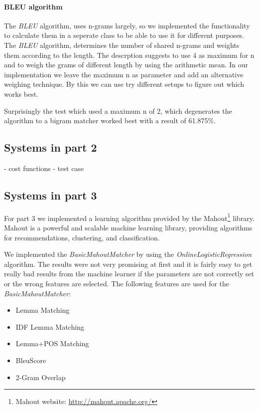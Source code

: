 \paragraph{BLEU algorithm}
The \textit{BLEU} algorithm, uses n-grams largely, so we implemented the functionality to
calculate them in a seperate class to be able to use it for different purposes.
The \textit{BLEU} algorithm, determines the number of shared n-grams and weights them
according to the length. The descrption suggests to use 4 as maximum for n and to weigh
the grams of different length by using the arithmetic mean. In our implementation we leave
the maximum n as parameter and add an alternative weighing technique. By this we can use
try different setups to figure out which works best. 

Surprisingly the test which used a maximum n of 2, which degenerates the algorithm to a
bigram matcher worked best with a result of 61.875\%.

\subsection{Systems in part 2}

- cost functions
- test case

\subsection{Systems in part 3}
For part 3 we implemented a learning algorithm provided by the Mahout\footnote{Mahout website:
\url{http://mahout.apache.org/}} library. Mahout is a powerful and scalable machine learning library, providing
algorithms for recommendations, clustering, and classification.

We implemented the \textit{BasicMahoutMatcher} by using
the \textit{OnlineLogisticRegression} algorithm. The results were not very promising at first and it is fairly easy to
get really bad results from the machine learner if the parameters are not correctly set or the wrong features are
selected. The following features are used for the \textit{BasicMahoutMatcher}:

\begin{itemize}
    \item Lemma Matching
    \item IDF Lemma Matching
    \item Lemma+POS Matching
    \item BleuScore
    \item 2-Gram Overlap
\end{itemize}

